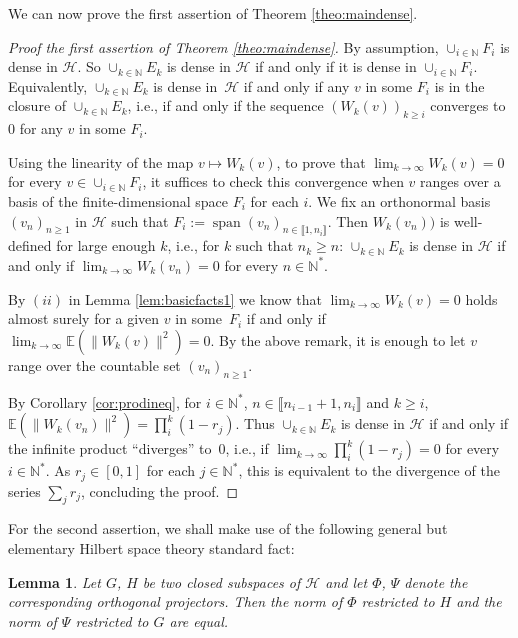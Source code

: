 \documentclass[pdftex]{sigma}%
\DeclareMathOperator{\psan}{span}
\newcommand{\hilH}{\mathcal H}
\newcommand{\norm}[1]{\lVert #1\rVert}
\newcommand{\nN}{n\in \mathbb{N}}
\newcommand{\kN}{k\in \mathbb{N}}
\newcommand{\jN}{j\in \mathbb{N}}
\newcommand{\iN}{i\in \mathbb{N}}
\newcommand{\intt}[1]{\llbracket #1 \rrbracket}
\newcommand{\expec}[1]{\mathbb{E}\left(#1\right)}
\newtheorem{Lemma}[Theorem]{Lemma}
\begin{document}
We can now prove the first assertion of Theorem \ref{theo:maindense}.

\begin{proof}[Proof the first assertion of Theorem \ref{theo:maindense}]
By assumption, $\cup_{\iN}F_i$ is dense in $\hilH$. So $\cup_{\kN}E_k$ is dense in $\hilH$ if and only if it is dense in $\cup_{\iN}F_i$. Equivalently, $\cup_{\kN}E_k$ is dense in~$\hilH$ if and only if any $v$ in some $F_i$ is in the closure of $\cup_{\kN}E_k$, i.e., if and only if the sequence $(W_k(v))_{k\geq i}$ converges to $0$ for any $v$ in some $F_i$.

Using the linearity of the map $v\mapsto W_k(v)$, to prove that $\lim_{k\to \infty} W_k(v)=0$ for every $v\in \cup_{\iN}F_i$, it suffices to check this convergence when $v$ ranges over a basis of the finite-dimensional space $F_i$ for each $i$. We fix an orthonormal basis $(v_n)_{n\geq 1}$ in $\hilH$ such that $F_i:=\psan (v_n)_{n\in \intt{1,n_i}}$. Then $W_k(v_n))$ is well-defined for large enough $k$, i.e., for $k$ such that $n_k\geq n$: $\cup_{\kN}E_k$ is dense in $\hilH$ if and only if $\lim_{k \to \infty} W_k(v_n)=0$ for every $\nN^*$.

By $(ii)$ in Lemma \ref{lem:basicfacts1} we know that $\lim_{k\to \infty} W_k(v)=0$ holds almost surely for a given $v$ in some~$F_i$ if and only if $\lim_{k\to \infty} \expec{\norm{W_k(v)}^2}=0$. By the above remark, it is enough to let $v$ range over the countable set $(v_n)_{n\geq 1}$.

By Corollary \ref{cor:prodineq}, for $\iN^*$, $n\in \intt{n_{i-1}+1,n_i}$ and $k\geq i$, $\expec{\norm{W_k(v_n)}^2}= \prod_{i}^{k} (1-r_j)$. Thus $\cup_{\kN}E_k$ is dense in $\hilH$ if and only if the infinite product ``diverges'' to~$0$, i.e., if $\lim_{k\to \infty} \prod_{i}^{k} (1-r_j)\allowbreak=0$ for every $\iN^*$. As $r_j\in [0,1]$ for each $\jN ^*$, this is equivalent to the divergence of the series $\sum_j r_j$, concluding the proof.
\end{proof}

For the second assertion, we shall make use of the following general but elementary Hilbert space theory standard fact:

\begin{Lemma} \label{lem:symnormproj}
 Let $G$, $H$ be two closed subspaces of $\hilH$ and let $\Phi$, $\Psi$ denote the corresponding orthogonal projectors. Then the norm of $\Phi$ restricted to $H$ and the norm of $\Psi$ restricted to $G$ are equal.
\end{Lemma}
\end{document}
